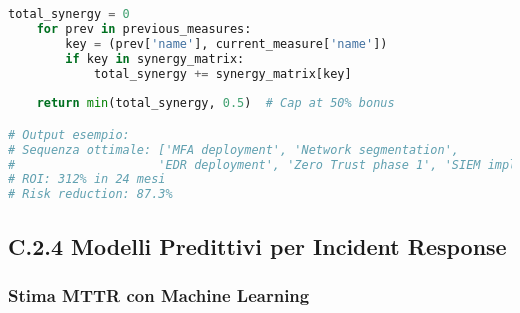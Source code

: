 \begin{lstlisting}[language=Python, caption=Ottimizzazione Sequenza Implementazione Security]
    total_synergy = 0
    for prev in previous_measures:
        key = (prev['name'], current_measure['name'])
        if key in synergy_matrix:
            total_synergy += synergy_matrix[key]
    
    return min(total_synergy, 0.5)  # Cap at 50% bonus

# Output esempio:
# Sequenza ottimale: ['MFA deployment', 'Network segmentation', 
#                    'EDR deployment', 'Zero Trust phase 1', 'SIEM implementation']
# ROI: 312% in 24 mesi
# Risk reduction: 87.3%
\end{lstlisting}

\subsection{\texorpdfstring{\textbf{C.2.4 Modelli Predittivi per Incident Response}}{C.2.4 - Modelli Predittivi per Incident Response}}

\subsubsection{Stima MTTR con Machine Learning}

